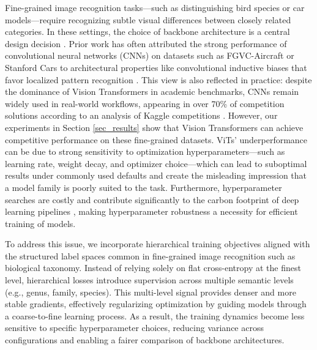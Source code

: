 \documentclass[10pt,twocolumn,letterpaper]{article}
\begin{document}
Fine-grained image recognition tasks—such as distinguishing bird species or car models—require recognizing subtle visual differences between closely related categories. In these settings, the choice of backbone architecture is a central design decision \cite{kornblith_better_2019,ye_image_2024,jeevan_which_2025}. Prior work has often attributed the strong performance of convolutional neural networks (CNNs) \cite{he_deep_2015} on datasets such as FGVC-Aircraft \cite{maji_fine-grained_2013} or Stanford Cars \cite{krause_3d_2013} to architectural properties like convolutional inductive biases that favor localized pattern recognition \cite{ye_image_2024}. This view is also reflected in practice: despite the dominance of Vision Transformers in academic benchmarks, CNNs remain widely used in real-world workflows, appearing in over 70\% of competition solutions according to an analysis of Kaggle competitions \cite{carlens_state_nodate, carlens_state_nodate-1, carlens_state_nodate-2}. However, our experiments in Section \ref{sec_results} show that Vision Transformers \cite{dosovitskiy_image_2021} can achieve competitive performance on these fine-grained datasets. ViTs' underperformance can be due to strong sensitivity to optimization hyperparameters—such as learning rate, weight decay, and optimizer choice—which can lead to suboptimal results under commonly used defaults and create the misleading impression that a model family is poorly suited to the task. Furthermore, hyperparameter searches are costly and contribute significantly to the carbon footprint of deep learning pipelines \cite{strubell_energy_2019, lacoste_quantifying_2019}, making hyperparameter robustness a necessity for efficient training of models.

To address this issue, we incorporate hierarchical training objectives aligned with the structured label spaces common in fine-grained image recognition such as biological taxonomy. Instead of relying solely on flat cross-entropy at the finest level, hierarchical losses introduce supervision across multiple semantic levels (e.g., genus, family, species). This multi-level signal provides denser and more stable gradients, effectively regularizing optimization by guiding models through a coarse-to-fine learning process. As a result, the training dynamics become less sensitive to specific hyperparameter choices, reducing variance across configurations and enabling a fairer comparison of backbone architectures.

\end{document}
